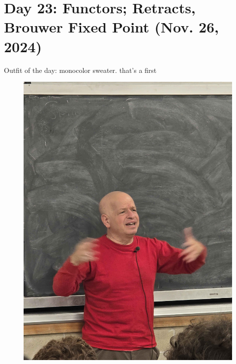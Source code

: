 \section{Day 23: Functors; Retracts, Brouwer Fixed Point (Nov. 26, 2024)}
Outfit of the day: monocolor sweater. that's a first
\begin{figure}[h]
    \centering
    \includegraphics[scale=0.1]{MAT327 Notes/Dror Shirts/dror day 23 shirt.jpg}
\end{figure}

